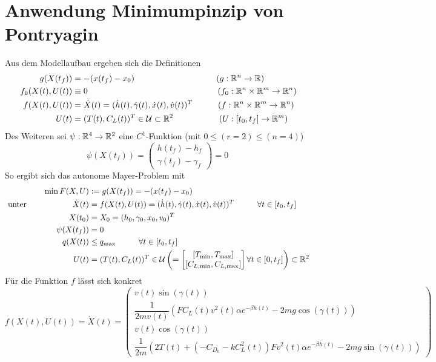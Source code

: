 \section{Anwendung Minimumpinzip von Pontryagin}
Aus dem Modellaufbau ergeben sich die Definitionen 
\[\begin{split}
g(X(t_f)) &=  -(x(t_f) - x_0) \hspace{34mm} (g : \R^n \to \R) \\\
f_0(X(t),U(t)) &\equiv 0 \hspace{54mm} (f_0 : \R^n \times \R^m \to \R^n)\\\
f(X(t),U(t)) &= \dot{X}(t) = (\dot{h}(t),\dot{\gamma}(t),\dot{x}(t),\dot{v}(t))^T \hspace{10.5mm} (f : \R^n \times \R^m \to \R^n) \\\
U(t) &= (T(t),C_L(t))^T \in \mathcal{U} \subset \R^2 \hspace{19mm} (U : [t_0,t_f] \to \R^m)
\end{split}\]
Des Weiteren sei $\psi : \mathbb{R}^4 \to \mathbb{R}^2$ eine $C^1$-Funktion (mit $0 \leq (r = 2) \leq (n = 4)$) \[\psi(X(t_f)) = \begin{pmatrix}
h(t_f) - h_f \\ 
\gamma(t_f) - \gamma_f
\end{pmatrix} = 0\]
So ergibt sich das autonome Mayer-Problem mit 
\[\begin{split}
\min F(X,U) &:= g(X(t_f)) =  -(x(t_f) - x_0) \\\
\text{unter}  \hspace{20mm} \dot{X}(t) &= f(X(t),U(t)) = (\dot{h}(t),\dot{\gamma}(t),\dot{x}(t),\dot{v}(t))^T \hspace{10mm} \forall t \in [t_0,t_f] \\\
%
X(t_0) &= X_0 = (h_0,\gamma_0,x_0,v_0)^T\\\
\psi(X(t_f)) &= 0\\\
%
q(X(t)) &\leq q_{\max} \hspace{10mm} \forall t \in [t_0,t_f] \\\
U(t) &= (T(t),C_L(t))^T \in \mathcal{U} \left( = \left[\begin{matrix}
[T_{\min},T_{\max}] \\ 
[C_{L, \min},C_{L, \max}]
\end{matrix} \right] \forall t \in [0,t_f] \right) \subset \R^2
\end{split} \]
Für die Funktion $f$ lässt sich konkret
\[f(X(t),U(t)) = \dot{X}(t) = \begin{pmatrix}
v(t) \sin(\gamma(t)) \\ 
\dfrac{1}{2mv(t)} \left(F C_L(t)v^2(t) \alpha e^{-\beta h(t)} - 2 m g \cos(\gamma(t)) \right) \\ 
v(t) \cos(\gamma(t)) \\ 
\dfrac{1}{2m} \left(2T(t) + (-C_{D_0}-k C_L^2(t)) F  v^2(t) \alpha e^{-\beta h(t)} - 2 m g \sin(\gamma(t)) \right)
\end{pmatrix} \]
